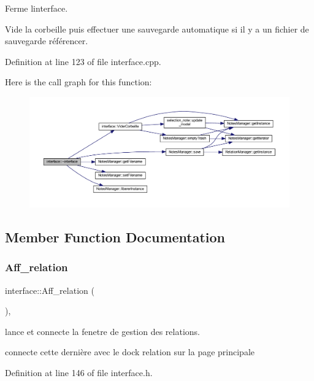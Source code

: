 Ferme l\textquotesingle{}interface. 

Vide la corbeille puis effectuer une sauvegarde automatique si il y a un fichier de sauvegarde référencer. 

Definition at line 123 of file interface.\+cpp.

Here is the call graph for this function\+:\nopagebreak
\begin{figure}[H]
\begin{center}
\leavevmode
\includegraphics[width=350pt]{classinterface_a8511f28c5bc5d3c24a24e9aaef4db502_cgraph}
\end{center}
\end{figure}


\subsection{Member Function Documentation}
\mbox{\label{classinterface_a287c8a46ece12a94540a190b96b911c9}} 
\subsubsection{\texorpdfstring{Aff\+\_\+relation}{Aff\_relation}}
{\footnotesize\ttfamily interface\+::\+Aff\+\_\+relation (\begin{DoxyParamCaption}{ }\end{DoxyParamCaption})\hspace{0.3cm}{\ttfamily [inline]}, {\ttfamily [slot]}}



lance et connecte la fenetre de gestion des relations. 

connecte cette dernière avec le dock relation sur la page principale 

Definition at line 146 of file interface.\+h.


